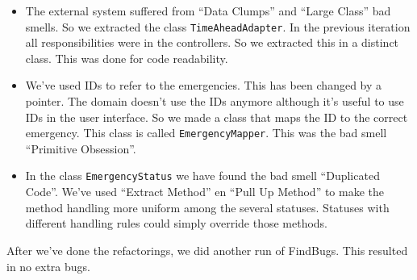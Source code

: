 \begin{itemize}
	\item The external system suffered from ``Data Clumps'' and ``Large Class'' bad smells. So we extracted the class \texttt{TimeAheadAdapter}. In the previous iteration all responsibilities were in the controllers. So we extracted this in a distinct class. This was done for code readability.
	\item We've used IDs to refer to the emergencies. This has been changed by a pointer. The domain doesn't use the IDs anymore although it's useful to use IDs in the user interface. So we made a class that maps the ID to the correct emergency. This class is called \texttt{EmergencyMapper}. This was the bad smell ``Primitive Obsession''.
	\item In the class \texttt{EmergencyStatus} we have found the bad smell ``Duplicated Code''. We've used ``Extract Method'' en ``Pull Up Method'' to make the method handling more uniform among the several statuses. Statuses with different handling rules could simply override those methods.
\end{itemize}
After we've done the refactorings, we did another run of FindBugs. This resulted in no extra bugs.